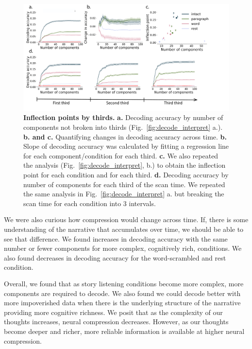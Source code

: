 \documentclass[english]{article}
\begin{document}


\begin{figure}
  \centering
  \includegraphics[width=\textwidth]{figs/decode_pcs.pdf}
  \caption{\textbf{Inflection points by thirds.} \textbf{a.}
    Decoding accuracy by number of components not broken into thirds
    (Fig.~\ref{fig:decode_interpret} a.). \textbf{b. and c.}
    Quantifying changes in decoding accuracy across
time. \textbf{b.} Slope of decoding accuracy was calculated by fitting
a regression line for each component/condition for each
third. \textbf{c.}  We also repeated the analysis
(Fig.~\ref{fig:decode_interpret}, b.) to obtain the inflection point
for each condition and for each third. \textbf{d.}  Decoding accuracy by number of components for each third of the scan time. We repeated the same analysis in Fig.~\ref{fig:decode_interpret} a. but breaking the scan time for each condition into 3 intervals.
}
  \label{fig:decode_pcs_thirds}
\end{figure}

We were also curious how compression would change across time.  If, there is some understanding of the narrative that accumulates over time, we should be able to see that difference. We found increases in decoding accuracy with the same number or fewer components for more complex, cognitively rich, conditions.
We also found decreases in decoding accuracy for the word-scrambled and rest
condition.

Overall, we found that as story listening conditions become more complex, more components are required to decode. We also found we could decode better with more impoverished data when
there is the underlying structure of the narrative providing more cognitive richness. We posit that as the complexity of our thoughts increases, neural compression decreases. However, as our thoughts become deeper and richer, more reliable information is available at higher neural compression.
\end{document}
